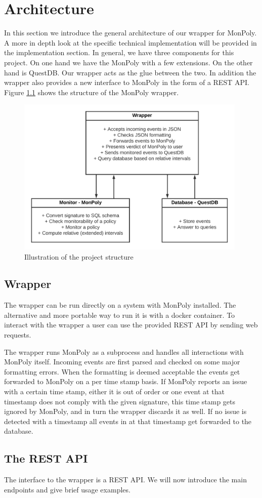 \chapter{Architecture}

In this section we introduce the general architecture of our wrapper for MonPoly.
A more in depth look at the specific technical implementation will be provided in the implementation section.
In general, we have three components for this project.
On one hand we have the MonPoly with a few extensions.
On the other hand is QuestDB.
Our wrapper acts as the glue between the two.
In addition the wrapper also provides a new interface to MonPoly in the form of a REST API.
Figure \ref{fig:wrapper} shows the structure of the MonPoly wrapper.

\begin{figure}
  \centering
  \includegraphics[width=110mm]{diagrams/wrapper.png}
  \caption{Illustration of the project structure}
  \label{fig:wrapper}
\end{figure}




\section{Wrapper}

The wrapper can be run directly on a system with MonPoly installed.
The alternative and more portable way to run it is with a docker container.
To interact with the wrapper a user can use the provided REST API by sending web requests.

The wrapper runs MonPoly as a subprocess and handles all interactions with MonPoly itself.
Incoming events are first parsed and checked on some major formatting errors.
When the formatting is deemed acceptable the events get forwarded to MonPoly on a per time stamp basis.
If MonPoly reports an issue with a certain time stamp, either it is out of order or one event at that timestamp does not comply with the given signature, this time stamp gets ignored by MonPoly, and in turn the wrapper discards it as well.
If no issue is detected with a timestamp all events in at that timestamp get forwarded to the database.

\section{The REST API}

The interface to the wrapper is a REST API.
We will now introduce the main endpoints and give brief usage examples.






